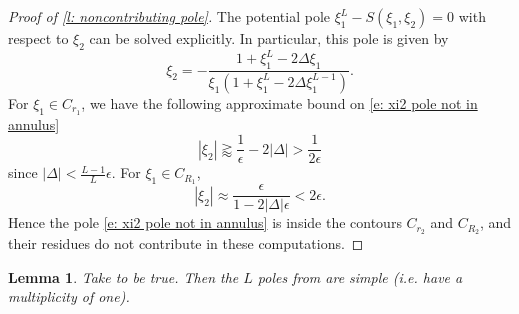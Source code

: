 \documentclass[a4paper,11pt]{article}
\newtheorem{lemma}[theorem]{Lemma}
\theoremstyle{definition}
\begin{document}
\begin{proof}[Proof of \cref{l: noncontributing pole}]
    The potential pole $\xi_1^L-S(\xi_1,\xi_2)=0$ with respect to $\xi_2$ can be solved explicitly. In particular, this pole is given by 
\begin{equation}\label{e: xi2 pole not in annulus}
    \xi_2 =-\frac{1+\xi_1^L-2\Delta\xi_1}{\xi_1\left(1+\xi_1^L-2\Delta \xi_1^{L-1}\right)}.
\end{equation}
For $\xi_1\in C_{r_1}$, we have the following approximate bound on \eqref{e: xi2 pole not in annulus}
\begin{equation}
    |\xi_2| \gtrapprox \frac1\epsilon-2|\Delta|>\frac{1}{2\epsilon}
\end{equation}
since $|\Delta|<\frac{L-1}{L}\epsilon$. For $\xi_1\in C_{R_1}$, \begin{equation}
    |\xi_2| \approx \frac{\epsilon}{1-2|\Delta|\epsilon}<2\epsilon.
\end{equation}
Hence the pole \eqref{e: xi2 pole not in annulus} is inside the contours $C_{r_2}$ and $C_{R_2}$, and their residues do not contribute in these computations. 
\end{proof}

\begin{lemma}\label{l: simple poles}
    Take  to be true. Then the $L$ poles from  are simple (i.e. have a multiplicity of one). 
\end{lemma}
\end{document}
